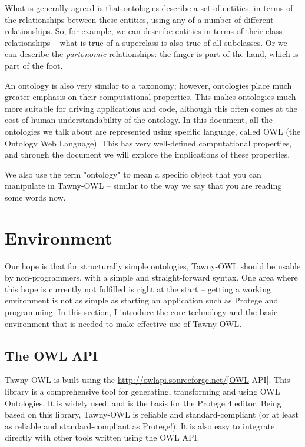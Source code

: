 \documentclass[11pt]{article}
\begin{document}
What is generally agreed is that ontologies describe a set of entities,
in terms of the relationships between these entities, using any of a
number of different relationships. So, for example, we can describe
entities in terms of their class relationships -- what is true of a
superclass is also true of all subclasses. Or we can describe the
\emph{partonomic} relationships: the finger is part of the hand, which is
part of the foot.

An ontology is also very similar to a taxonomy; however, ontologies
place much greater emphasis on their computational properties. This
makes ontologies much more suitable for driving applications and code,
although this often comes at the cost of human understandability of the
ontology. In this document, all the ontologies we talk about are
represented using specific language, called OWL (the Ontology Web
Language). This has very well-defined computational properties, and
through the document we will explore the implications of these
properties.

We also use the term "ontology" to mean a specific object that you can
manipulate in Tawny-OWL -- similar to the way we say that you are
reading some words now.


\section{Environment}
\label{sec-3}

Our hope is that for structurally simple ontologies, Tawny-OWL should be
usable by non-programmers, with a simple and straight-forward syntax.
One area where this hope is currently not fulfilled is right at the
start -- getting a working environment is not as simple as starting an
application such as Protege and programming. In this section, I
introduce the core technology and the basic environment that is needed
to make effective use of Tawny-OWL.


\subsection{The OWL API}
\label{sec-3-1}

Tawny-OWL is built using the \url{http://owlapi.sourceforge.net/[OWL} API].
This library is a comprehensive tool for generating, transforming and
using OWL Ontologies. It is widely used, and is the basis for the
Protege 4 editor. Being based on this library, Tawny-OWL is reliable and
standard-compliant (or at least as reliable and standard-compliant as
Protege!). It is also easy to integrate directly with other tools
written using the OWL API.
\end{document}
